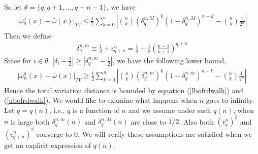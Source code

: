 \documentclass{article}
\begin{document}
So let $\theta=\{q,q+1,...,q+n-1\}$, we have
\begin{eqnarray}
\label{ubofrdwalk} 
|\omega_n^q(x)-\bar{\omega}(x)|_{TV} \le 
    \frac{1}{2}  \sum_{k=0}^n \left|{n \choose k} (\delta^{n,M}_q)^k (1-\delta^{n,M}_q)^{n-k} -{n \choose k} \frac{1}{2^n} \right| 
\end{eqnarray}
Then we define 
\begin{eqnarray} 
   \delta^{n,m}_q \equiv \frac{1}{2}+ \epsilon^n_{q+n} = \frac{1}{2} +\frac{1}{2} \left(\frac{n-1}{n+1}\right)^{q+n}
\end{eqnarray}
Since for $i \in \theta$, $|\delta_i-\frac{1}{2}| \ge |\delta^{n,m}_q-\frac{1}{2}| $, we have the following lower bound,
\begin{eqnarray}
\label{lbofrdwalk}  
|\omega_n^q(x)-\bar{\omega}(x)|_{TV} \ge 
    \frac{1}{2}  \sum_{k=0}^n \left|{n \choose k} (\delta^{n,m}_q)^k (1-\delta^{n,m}_q)^{n-k} -{n \choose k} \frac{1}{2^n} \right| 
\end{eqnarray}
Hence the total variation distance is bounded by equation (\ref{lbofrdwalk}) and (\ref{ubofrdwalk}). We would like to examine what happens when $n$ goes to infinity. Let $q=q(n)$, i.e., $q$ is a function of $n$ and we assume under such $q(n)$, when $n$ is large both $\delta^{n,m}_q(n)$ and $\delta^{n,M}_q(n)$ are close to $1/2$. Also both $(\epsilon^n_q)^2$  and $(\epsilon^n_{q+n})^2$ converge to $0$. We will verify these assumptions are satisfied when we get an explicit expression of $q(n)$. 
\end{document}
